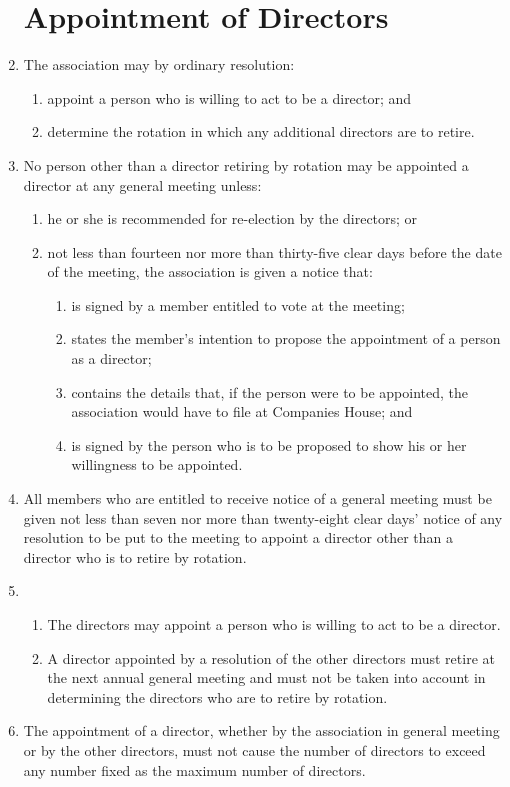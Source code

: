 \begin{enumerate}
\section{Appointment of Directors}

\item
  The association may by ordinary resolution:
  \begin{enumerate}
  \item
    appoint a person who is willing to act to be a director; and
  \item
    determine the rotation in which any additional directors are to
    retire.
  \end{enumerate}

\item
  No person other than a director retiring by rotation may be
  appointed a director at any general meeting unless:
  \begin{enumerate}
  \item
    he or she is recommended for re-election by the directors; or
  \item
    not less than fourteen nor more than thirty-five clear days before
    the date of the meeting, the association is given a notice that:
    \begin{enumerate}
    \item
      is signed by a member entitled to vote at the meeting;
    \item
      states the member's intention to propose the appointment of a
      person as a director;
    \item
      contains the details that, if the person were to be appointed, the
      association would have to file at Companies House; and
    \item
      is signed by the person who is to be proposed to show his or her
      willingness to be appointed.
    \end{enumerate}
  \end{enumerate}
\item
  All members who are entitled to receive notice of a general meeting
  must be given not less than seven nor more than twenty-eight clear
  days' notice of any resolution to be put to the meeting to appoint
  a director other than a director who is to retire by rotation.

\item
  \begin{enumerate}
  \item
    The directors may appoint a person who is willing to act to be a
    director.
  \item
    A director appointed by a resolution of the other directors must
    retire at the next annual general meeting and must not be taken
    into account in determining the directors who are to retire by
    rotation.
  \end{enumerate}
\item
  The appointment of a director, whether by the association in general
  meeting or by the other directors, must not cause the number of
  directors to exceed any number fixed as the maximum number of
  directors.


\end{enumerate}

